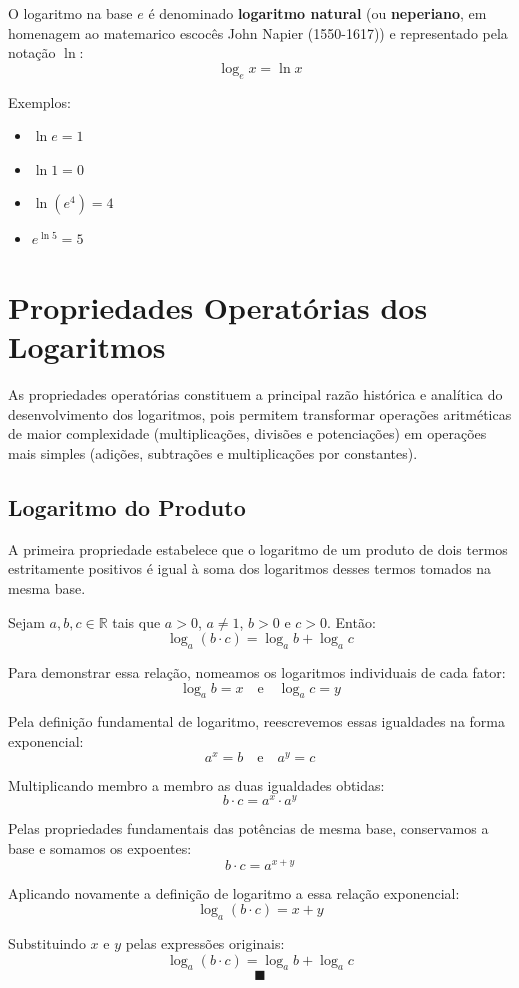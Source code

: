 \documentclass[12pt,a4paper]{report}
\begin{document}
	O logaritmo na base $e$ é denominado \textbf{logaritmo natural} (ou \textbf{neperiano}, em homenagem ao matemarico escocês John Napier (1550-1617)) e representado pela notação $\ln$:
	$$\log_e x = \ln x$$
	
	Exemplos:
	\begin{itemize}[label=$\circ$]
		\item $\ln e = 1$
		\item $\ln 1 = 0$
		\item $\ln (e^4) = 4$
		\item $e^{\ln 5} = 5$
	\end{itemize}
	
	\section{Propriedades Operatórias dos Logaritmos}
	
	As propriedades operatórias constituem a principal razão histórica e analítica do desenvolvimento dos logaritmos, pois permitem transformar operações aritméticas de maior complexidade (multiplicações, divisões e potenciações) em operações mais simples (adições, subtrações e multiplicações por constantes).
	
	\subsection{Logaritmo do Produto}
	
	A primeira propriedade estabelece que o logaritmo de um produto de dois termos estritamente positivos é igual à soma dos logaritmos desses termos tomados na mesma base.
	
	\begin{destaque}
		Sejam $a, b, c \in \mathbb{R}$ tais que $a > 0$, $a \neq 1$, $b > 0$ e $c > 0$. Então:
		$$\log_a (b \cdot c) = \log_a b + \log_a c$$
	\end{destaque}
	
	\begin{destaque}[Demonstração]
		Para demonstrar essa relação, nomeamos os logaritmos individuais de cada fator:
		$$\log_a b = x \quad \text{e} \quad \log_a c = y$$
		
		Pela definição fundamental de logaritmo, reescrevemos essas igualdades na forma exponencial:
		$$a^x = b \quad \text{e} \quad a^y = c$$
		
		Multiplicando membro a membro as duas igualdades obtidas:
		$$b \cdot c = a^x \cdot a^y$$
		
		Pelas propriedades fundamentais das potências de mesma base, conservamos a base e somamos os expoentes:
		$$b \cdot c = a^{x + y}$$
		
		Aplicando novamente a definição de logaritmo a essa relação exponencial:
		$$\log_a (b \cdot c) = x + y$$
		
		Substituindo $x$ e $y$ pelas expressões originais:
		$$\log_a (b \cdot c) = \log_a b + \log_a c$$
		$$\blacksquare$$
	\end{destaque}
	
\end{document}
